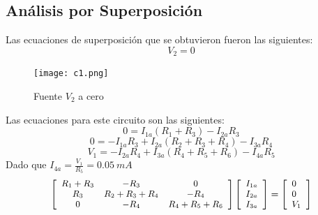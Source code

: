 \documentclass[twocolumn]{IEEEtran}
\begin{document}
\subsection{Análisis por Superposición}
\noindent
Las ecuaciones de superposición que se obtuvieron fueron las siguientes:\\
$$V_2 = 0$$
\begin{figure}[H]
	\centering
		\texttt{[image: c1.png]}
	\caption{Fuente $V_2$ a cero}
	\label{fig2}
\end{figure}
\noindent
Las ecuaciones para este circuito son las siguientes:
\begin{equation}
 0 = {I_{1a}}\left( {{R_1} + {R_3}} \right) - {I_{2a}}{R_3}
\end{equation}
\begin{equation}
 0 =  - {I_{1a}}{R_3} + {I_{2a}}\left( {{R_2} + {R_3} + {R_4}} \right) - {I_{3a}}{R_4}
\end{equation}
\begin{equation}
 {V_1} =  - {I_{2a}}{R_4} + {I_{3a}}\left( {{R_4} + {R_5} + {R_6}} \right) - {I_{4a}}{R_5}
\end{equation}
\noindent
Dado que $I_{4a} = \frac{V_1}{R_5} = 0.05 \ mA$
\begin{equation}
\footnotesize
 \left[ {\begin{array}{*{20}{c}}
   {{R_1} + {R_3}} & { - {R_3}} & 0  \\
   {{R_3}} & {{R_2} + {R_3} + {R_4}} & { - {R_4}}  \\
   0 & { - {R_4}} & {{R_4} + {R_5} + {R_6}}  \\
\end{array}} \right]\left[ \begin{array}{l}
 {I_{1a}} \\ 
 {I_{2a}} \\ 
 {I_{3a}} \\ 
 \end{array} \right] = \left[ \begin{array}{l}
 0 \\ 
 0 \\ 
 {V_1} \\ 
 \end{array} \right]
\label{mat2}
\end{equation}
\end{document}
